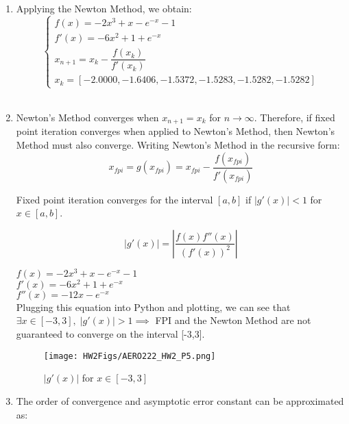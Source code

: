 \documentclass[12pt]{article}
\begin{document}
\begin{description}
\begin{enumerate} [label=(\alph*)]
			\item Applying the Newton Method, we obtain: \\
			\begin{equation*}
			\begin{cases}
			f(x) = -2x^3 + x - e^{-x} - 1 \\
			f'(x) = -6x^2 + 1 + e^{-x} \\
			x_{n+1} = x_k-\dfrac{f(x_k)}{f'(x_k)} \\
			x_k = [-2.0000, -1.6406, -1.5372, -1.5283, -1.5282, -1.5282]
			\end{cases}
			\end{equation*}
			\\
			
			
			\item Newton's Method converges when $x_{n+1} = x_k$ for $n \rightarrow \infty$. Therefore, if fixed point iteration converges when applied to Newton's Method, then Newton's Method must also converge.  Writing Newton's Method in the recursive form:
			\begin{equation*}
			x_{fpi} = g(x_{fpi}) = x_{fpi}-\frac{f(x_{fpi})}{f'(x_{fpi})}
			\end{equation*}
			
			Fixed point iteration converges for the interval $[a,b]$ if $|g'(x)| < 1$ for $x \in [a,b]$.
			
			\begin{equation*}
			|g'(x)| = \left| \frac{f(x)f''(x)}{(f'(x))^2} \right|
			\end{equation*}
			
			$f(x) = -2x^3 + x - e^{-x} - 1$ \\
			$f'(x) = -6x^2 + 1 + e^{-x}$ \\
			$f''(x) = -12x - e^{-x}$ \\
			
			Plugging this equation into Python and plotting, we can see that $\exists x \in [-3,3], \; |g'(x)| > 1 \implies$ FPI and the Newton Method are not guaranteed to converge on the interval [-3,3].
			
			\begin{figure}[ht]	\centering\texttt{[image: HW2Figs/AERO222\_HW2\_P5.png]}
				\caption{$\left|g'(x)\right|$ for $x \in \left[-3,3\right]$}
			\end{figure}
			
			\item The order of convergence and asymptotic error constant can be approximated as:
			

\end{enumerate}
\end{description}
\end{document}
